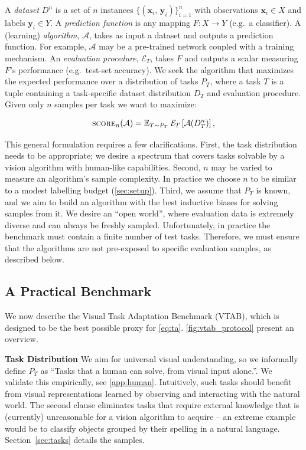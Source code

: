 A \emph{dataset} $D^n$ is a set of $n$ instances $\{({\bm{x}}_i,\, {\bm{y}}_i)\}_{i=1}^n$ with observations  ${\bm{x}}_i \in X$ and labels ${\bm{y}}_i \in Y$. A \emph{prediction function} is any mapping $F: X \to Y$ (e.g.\ a classifier). A (learning) \emph{algorithm}, $\mathcal{A}$, takes as input a dataset and outputs a prediction function. For example, $\mathcal{A}$ may be a pre-trained network coupled with a training mechanism. An \emph{evaluation procedure}, $\mathcal{E}_T$, takes $F$ and outputs a scalar measuring $F$'s performance (e.g.\ test-set accuracy). We seek the algorithm that maximizes the expected performance over a distribution of tasks $P_T$, where a task $T$ is a tuple containing a task-specific dataset distribution $D_T$ and evaluation procedure. Given only $n$ samples per task we want to maximize:

\begin{align}
\textsc{score}_n(\mathcal{A}) = \mathbb{E}_{T \sim P_T}\; \mathcal{E}_T\left[ \mathcal{A}(D_T^n) \right],\label{eq:ta}
\end{align}

This general formulation requires a few clarifications. First, the task distribution needs to be appropriate; we desire a spectrum that covers tasks solvable by a vision algorithm with human-like capabilities. Second, $n$ may be varied to measure an algorithm's sample complexity. In practice we choose $n$ to be similar to a modest labelling budget (\ref{sec:setup}).
Third, we assume that $P_T$ is known, and we aim to build an algorithm with the best inductive biases for solving samples from it. We desire an ``open world'', where evaluation data is extremely diverse and can always be freshly sampled. Unfortunately, in practice the benchmark must contain a finite number of test tasks. Therefore, we must ensure that the algorithms are not pre-exposed to specific evaluation samples, as described below.

\subsection{A Practical Benchmark} We now describe the Visual Task Adaptation Benchmark (VTAB), which is designed to be the best possible proxy for \ref{eq:ta}.
\ref{fig:vtab_protocol} present an overview.

\textbf{Task Distribution}\quad
We aim for universal visual understanding, so we informally define $P_T$ as ``Tasks that a human can solve, from visual input alone.''. We validate this empirically, see \ref{app:human}.
Intuitively, such tasks should benefit from visual representations learned by observing and interacting with the natural world. The second clause eliminates tasks that require external knowledge that is (currently) unreasonable for a vision algorithm to acquire -- an extreme example would be to classify objects grouped by their spelling in a natural language.
Section~\ref{sec:tasks} details the samples.


